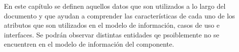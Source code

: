 En este capítulo se definen aquellos datos que son utilizados a lo largo del documento y que ayudan a comprender las características de  cada uno de los atributos que son 
utilizados en el modelo de información, casos de uso e interfaces. Se podrán observar distintas entidades qe psoiblemente no se 
encuentren en el modelo de información del componente.

	
	